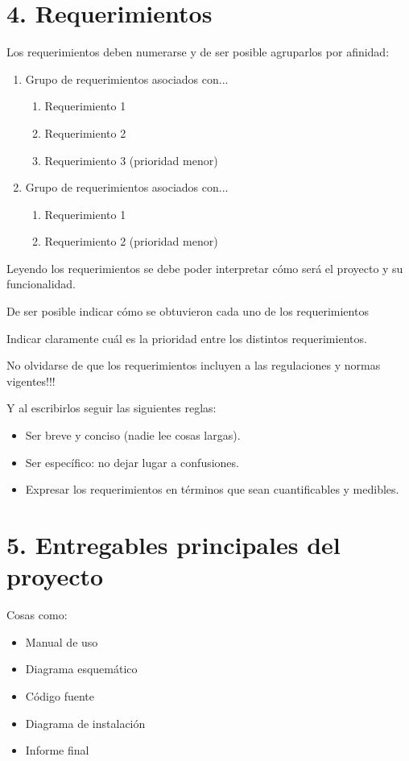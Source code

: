 \documentclass[11pt]{charter}
\begin{document}
\section{4. Requerimientos}
\label{sec:requerimientos}

Los requerimientos deben numerarse y de ser posible agruparlos por afinidad:

\begin{enumerate}
\item Grupo de requerimientos asociados con...
	\begin{enumerate}
	\item Requerimiento 1
	\item Requerimiento 2
	\item Requerimiento 3 (prioridad menor)
	\end{enumerate}
\item Grupo de requerimientos asociados con...
	\begin{enumerate}
	\item Requerimiento 1
	\item Requerimiento 2 (prioridad menor)
	\end{enumerate}
\end{enumerate}

Leyendo los requerimientos se debe poder interpretar cómo será el proyecto y su funcionalidad.

De ser posible indicar cómo se obtuvieron cada uno de los requerimientos 

Indicar claramente cuál es la prioridad entre los distintos requerimientos. 

No olvidarse de que los requerimientos incluyen a las regulaciones y normas vigentes!!!

Y al escribirlos seguir las siguientes reglas:
\begin{itemize}
\item Ser breve y conciso (nadie lee cosas largas). 
\item Ser específico: no dejar lugar a confusiones.
\item Expresar los requerimientos en términos que sean cuantificables y medibles.
\end{itemize}

\section{5. Entregables principales del proyecto}
\label{sec:entregables}

Cosas como: 
\begin{itemize}
\item Manual de uso
\item Diagrama esquemático
\item Código fuente
\item Diagrama de instalación
\item Informe final

\end{itemize}
\end{document}

